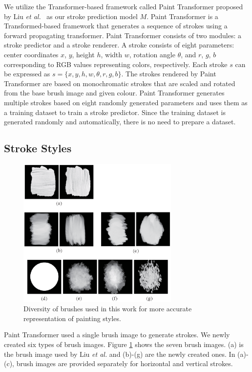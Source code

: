 \documentclass{mva_style}
\begin{document}
We utilize the Transformer-based framework called Paint Transformer proposed by
Liu \textit{et al.}~\cite{PaintTransformer} as our stroke prediction model $M$.
Paint Transformer is a Transformed-based framework that generates a sequence of
strokes using a forward propagating transformer.  Paint Transformer consists of
two modules: a stroke predictor and a stroke renderer. 
A stroke consists of eight parameters: center coordinates $x$, $y$, height $h$,
width $w$, rotation angle $\theta$, and $r$, $g$, $b$ corresponding to RGB values 
representing colors, respectively. Each stroke $s$ can be expressed as $s = \{ x,
y, h, w, \theta, r, g, b \}$. The strokes rendered by Paint
Transformer are based on monochromatic strokes that are scaled and rotated from the base
brush image and given colour. Paint Transformer generates multiple strokes based on eight
randomly generated parameters and uses them as a training dataset to train a
stroke predictor. Since the training dataset is generated randomly and
automatically, there is no need to prepare a dataset. 

\subsection{Stroke Styles}

\begin{figure}
  \centering
  \includegraphics[width=80mm]{resource/brushes.eps}
  \caption{Diversity of brushes used in this work for more accurate representation of painting styles.}
  \label{fig:brushes}
\end{figure}

Paint Transformer used a single brush image to generate strokes. 
We newly created six types of brush images. Figure \ref{fig:brushes} shows 
the seven brush images. (a) is the brush image used by Liu \textit{et al.} and (b)-(g) 
are the newly created ones. In (a)-(c), brush images are provided separately for
horizontal and vertical strokes.
\end{document}
